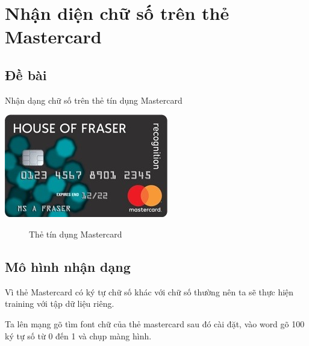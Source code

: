 \section{Nhận diện chữ số trên thẻ Mastercard}

\subsection{Đề bài}
Nhận dạng chữ số trên thẻ tín dụng Mastercard
\begin{center}
    \includegraphics[scale = 1.2]{images/mastercard/inputMastercard}
\end{center}
\begin{figure}[h]
    \caption{Thẻ tín dụng Mastercard}
\end{figure}

\subsection{Mô hình nhận dạng}

    \quad Vì thẻ Mastercard có ký tự chữ số khác với chữ số thường nên ta sẽ thực
hiện training với tập dữ liệu riêng.

    \quad Ta lên mạng gõ tìm font chữ của thẻ mastercard sau đó cài đặt, vào word
gõ 100 ký tự số từ 0 đến 1 và chụp màng hình. 

